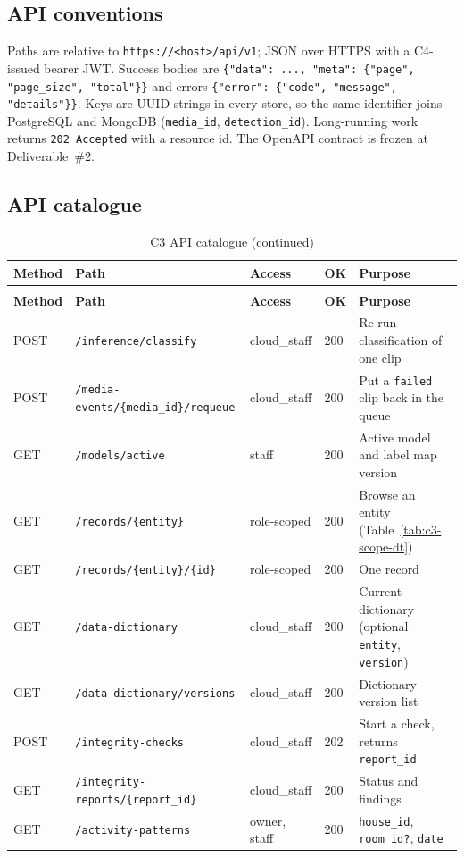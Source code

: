 \subsection{API conventions}
Paths are relative to \texttt{https://<host>/api/v1}; JSON over HTTPS with a C4-issued bearer JWT. Success bodies
are \texttt{\{"data": ..., "meta": \{"page", "page\_size", "total"\}\}} and errors \texttt{\{"error": \{"code", "message", "details"\}\}}.
Keys are UUID strings in every store, so the same identifier joins PostgreSQL and MongoDB (\texttt{media\_id},
\texttt{detection\_id}). Long-running work returns \texttt{202 Accepted} with a resource id. The OpenAPI contract is frozen at Deliverable~\#2.

\subsection{API catalogue}
\begin{longtable}{L{1.2cm}L{4.8cm}L{3.0cm}L{1.2cm}L{4.4cm}}
\caption{C3 API catalogue}\label{tab:c3-catalogue}\\
\toprule
\textbf{Method} & \textbf{Path} & \textbf{Access} & \textbf{OK} & \textbf{Purpose} \\
\midrule
\endfirsthead
\caption[]{C3 API catalogue (continued)}\\
\toprule
\textbf{Method} & \textbf{Path} & \textbf{Access} & \textbf{OK} & \textbf{Purpose} \\
\midrule
\endhead
POST & \texttt{/inference/classify} & cloud\_staff & 200 & Re-run classification of one clip \\
POST & \texttt{/media-events/\{media\_id\}/requeue} & cloud\_staff & 200 & Put a \texttt{failed} clip back in the queue \\
GET & \texttt{/models/active} & staff & 200 & Active model and label map version \\
GET & \texttt{/records/\{entity\}} & role-scoped & 200 & Browse an entity (Table~\ref{tab:c3-scope-dt}) \\
GET & \texttt{/records/\{entity\}/\{id\}} & role-scoped & 200 & One record \\
GET & \texttt{/data-dictionary} & cloud\_staff & 200 & Current dictionary (optional \texttt{entity}, \texttt{version}) \\
GET & \texttt{/data-dictionary/versions} & cloud\_staff & 200 & Dictionary version list \\
POST & \texttt{/integrity-checks} & cloud\_staff & 202 & Start a check, returns \texttt{report\_id} \\
GET & \texttt{/integrity-reports/\{report\_id\}} & cloud\_staff & 200 & Status and findings \\
GET & \texttt{/activity-patterns} & owner, staff & 200 & \texttt{house\_id}, \texttt{room\_id?}, \texttt{date} \\
\bottomrule
\end{longtable}


